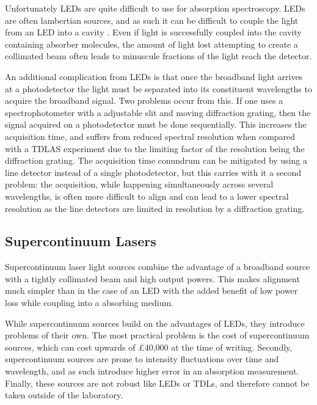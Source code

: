 Unfortunately \acp{LED} are quite difficult to use for absorption
spectroscopy. \acp{LED} are often lambertian sources, and as such it
can be difficult to couple the light from an \ac{LED} into a cavity
\cite{Seetohul:2009du,Islam:2007ea}. Even if light is successfully coupled
into the cavity containing absorber molecules, the amount of light lost
attempting to create a collimated beam often leads to minuscule fractions of
the light reach the detector.

An additional complication from \acp{LED} is that once the broadband light
arrives at a photodetector the light must be separated into its constituent
wavelengths to acquire the broadband signal. Two problems occur from
this. If one uses a spectrophotometer with a adjustable slit and moving
diffraction grating, then the signal acquired on a photodetector must be
done sequentially. This increases the acquisition time, and suffers from
reduced spectral resolution when compared with a \ac{TDLAS} experiment due
to the limiting factor of the resolution being the diffraction grating. The
acquisition time conundrum can be mitigated by using a line detector instead
of a single photodetector, but this carries with it a second problem: the
acquisition, while happening simultaneously across several wavelengths, is
often more difficult to align and can lead to a lower spectral resolution as
the line detectors are limited in resolution by a diffraction grating.



\subsection{Supercontinuum Lasers}\label{subsec:super}

Supercontinuum laser light sources combine the advantage of a broadband source
with a tightly collimated beam and high output powers. This makes alignment
much simpler than in the case of an \ac{LED} with the added benefit of low
power loss while coupling into a absorbing medium.

While supercontinuum sources build on the advantages of \acp{LED}, they
introduce problems of their own. The most practical problem is the cost of
supercontinuum sources, which can cost upwards of \pounds40,000 at the time of
writing. Secondly, supercontinuum sources are prone to intensity fluctuations
over time and wavelength, and as such introduce higher error in an absorption
measurement.  Finally, these sources are not robust like \acp{LED} or
\acp{TDL}, and therefore cannot be taken outside of the laboratory.



